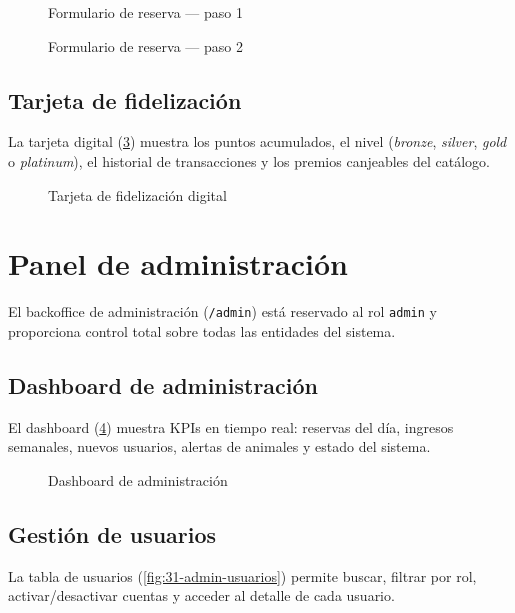 \documentclass[12pt,a4paper,twoside,openright]{report}
\begin{document}
\begin{figure}[H]
  \centering
  \fbox{\rule{0pt}{6cm}\rule{12cm}{0pt}}
  \caption{Formulario de reserva — paso 1}
  \label{fig:23-reservar-step1}
\end{figure}

\begin{figure}[H]
  \centering
  \fbox{\rule{0pt}{6cm}\rule{12cm}{0pt}}
  \caption{Formulario de reserva — paso 2}
  \label{fig:24-reservar-step2}
\end{figure}

\subsection{Tarjeta de fidelización}
La tarjeta digital (\cref{fig:26-loyalty-card}) muestra los puntos acumulados,
el nivel (\textit{bronze}, \textit{silver}, \textit{gold} o \textit{platinum}), el historial de
transacciones y los premios canjeables del catálogo.

\begin{figure}[H]
  \centering
  \fbox{\rule{0pt}{6cm}\rule{12cm}{0pt}}
  \caption{Tarjeta de fidelización digital}
  \label{fig:26-loyalty-card}
\end{figure}

\section{Panel de administración}
\label{sec:manual-admin}

El backoffice de administración (\texttt{/admin}) está reservado al rol
\texttt{admin} y proporciona control total sobre todas las entidades del sistema.

\subsection{Dashboard de administración}
El dashboard (\cref{fig:30-admin-dashboard}) muestra KPIs en tiempo real:
reservas del día, ingresos semanales, nuevos usuarios, alertas de animales y
estado del sistema.

\begin{figure}[H]
  \centering
  \fbox{\rule{0pt}{6cm}\rule{12cm}{0pt}}
  \caption{Dashboard de administración}
  \label{fig:30-admin-dashboard}
\end{figure}

\subsection{Gestión de usuarios}
La tabla de usuarios (\cref{fig:31-admin-usuarios}) permite buscar, filtrar por
rol, activar/desactivar cuentas y acceder al detalle de cada usuario.
\end{document}
